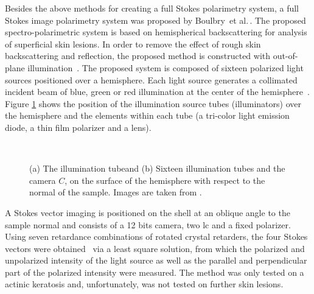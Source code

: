 Besides the above methods for creating a full Stokes polarimetry system, a full Stokes image polarimetry system was proposed by Boulbry~et al.\,\cite{boulbry2006novel}.
The proposed spectro-polarimetric system is based on hemispherical backscattering for analysis of superficial skin lesions.
In order to remove the effect of rough skin backscattering and reflection, the proposed method is constructed with out-of-plane illumination~\cite{ramella2005out}.
The proposed system is composed of sixteen polarized light sources positioned over a hemisphere.
Each light source generates a collimated incident beam of blue, green or red illumination at the center of the hemisphere~\cite{boulbry2006novel}.
Figure \ref{fig:SVhemisphere} shows the position of the illumination source tubes (illuminators) over the hemisphere and the elements within each tube (a tri-color light emission diode, a thin film polarizer and a lens). 
	\begin{figure}
	\ \hfil
	\caption[Polarimetric device proposed by \cite{boulbry2006novel}]{(a) The illumination tubeand (b) Sixteen illumination tubes and the camera $C$, on the surface of the hemisphere with respect to the normal of the sample. Images are taken from \cite{boulbry2006novel}.} 			 			    
	\label{fig:SVhemisphere}
	\end{figure}

\noindent A Stokes vector imaging is positioned on the shell at an oblique angle to the sample normal and consists of a 12 bits camera, two \ac{lc} and a fixed polarizer. 
Using seven retardance combinations of rotated crystal retarders, the four Stokes vectors were obtained~\cite{boulbry2006novel} via a least square solution, from which the polarized and unpolarized intensity of the light source as well as the parallel and perpendicular part of the polarized intensity were measured.
The method was only tested on a actinic keratosis and, unfortunately, was not tested on further skin lesions.


